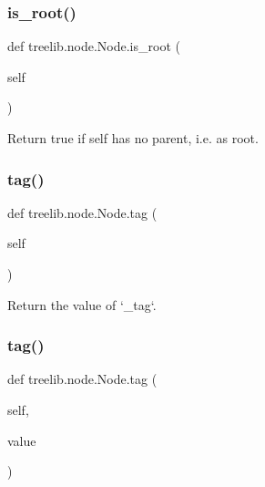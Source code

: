 \subsubsection{\texorpdfstring{is\+\_\+root()}{is\_root()}}
{\footnotesize\ttfamily def treelib.\+node.\+Node.\+is\+\_\+root (\begin{DoxyParamCaption}\item[{}]{self }\end{DoxyParamCaption})}

\begin{DoxyVerb}Return true if self has no parent, i.e. as root.\end{DoxyVerb}
 \mbox{\label{classtreelib_1_1node_1_1Node_a68ca07ba126979d83543f213e7f52c3e}} 
\subsubsection{\texorpdfstring{tag()}{tag()}\hspace{0.1cm}{\footnotesize\ttfamily [1/2]}}
{\footnotesize\ttfamily def treelib.\+node.\+Node.\+tag (\begin{DoxyParamCaption}\item[{}]{self }\end{DoxyParamCaption})}

\begin{DoxyVerb}Return the value of `_tag`.\end{DoxyVerb}
 \mbox{\label{classtreelib_1_1node_1_1Node_a467000d0a2e363fb0103d68bcda6523e}} 
\subsubsection{\texorpdfstring{tag()}{tag()}\hspace{0.1cm}{\footnotesize\ttfamily [2/2]}}
{\footnotesize\ttfamily def treelib.\+node.\+Node.\+tag (\begin{DoxyParamCaption}\item[{}]{self,  }\item[{}]{value }\end{DoxyParamCaption})}

